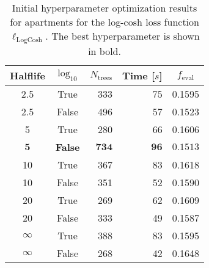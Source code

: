 \begin{table}[h!]
  \centerfloat
  \begin{tabular}{@{}ccrrc@{}}
    Halflife & $\log_{10}$ & $N_\mathrm{trees}$ & Time [$s$] & $f_\mathrm{eval}$ \\
    \midrule
    \num{2.5} & True & \num{333} & \num{75} & \num{0.1595} \\
    \num{2.5} & False & \num{496} & \num{57} & \num{0.1523} \\
    \num{5} & True & \num{280} & \num{66} & \num{0.1606} \\
    $\mathbf{5}$ & \textbf{False} & $\mathbf{734}$ & $\mathbf{96}$ & $\mathbf{0.1513}$ \\
    \num{10} & True & \num{367} & \num{83} & \num{0.1618} \\
    \num{10} & False & \num{351} & \num{52} & \num{0.1590} \\
    \num{20} & True & \num{269} & \num{62} & \num{0.1609} \\
    \num{20} & False & \num{333} & \num{49} & \num{0.1587} \\
    $\infty$ & True & \num{388} & \num{83} & \num{0.1595} \\
    $\infty$ & False & \num{268} & \num{42} & \num{0.1648} \\
  \end{tabular}
  \caption[Initial Hyperparameter Optimization Results for Apartments -- Log-Cosh Loss Function]{\label{tab:h:HPO_initial_Logcosh-ejerlejlighed-appendix}Initial hyperparameter optimization results for apartments for the log-cosh loss function $\ell_\mathrm{LogCosh}$. The best hyperparameter is shown in bold.}
\end{table}



